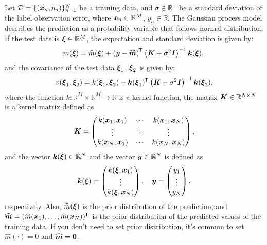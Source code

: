 \documentclass[twocolumn, a4paper, 10pt]{article}
\begin{document}
Let $\mathcal{D} = \{(\boldsymbol{x}_n, y_n)\}_{n=1}^{N}$ be a training data, and $\sigma \in \mathbb{R}^{+}$
be a standard deviation of the label observation error, where $\boldsymbol{x}_n \in \mathbb{R}^M$, $y_n \in \mathbb{R}$.
The Gaussian process model describes the prediction as a probability variable that follows normal distribution.
If the test date is $\boldsymbol{\xi} \in \mathbb{R}^M$, the expectation and standard deviation is given by:
\begin{equation}
    m (\boldsymbol{\xi}) = \widehat{m} (\boldsymbol{\xi}) + \left( \boldsymbol{y} - \widehat{\boldsymbol{m}} \right)^{\mkern-1.5mu\mathsf{T}}\hspace{0.5pt}
    \left (\boldsymbol{K} + \sigma^2 \boldsymbol{I} \right)^{-1} \boldsymbol{k} (\boldsymbol{\xi}),
    \label{eqn:gp_exp} \\
\end{equation}
and the covariance of the test data $\boldsymbol{\xi}_1$, $\boldsymbol{\xi}_2$ is given by:
\begin{equation}
    v (\boldsymbol{\xi}_1, \boldsymbol{\xi}_2) = k (\boldsymbol{\xi}_1, \boldsymbol{\xi}_2)
    - \boldsymbol{k} (\boldsymbol{\xi}_1)^{\mkern-1.5mu\mathsf{T}}\hspace{0.5pt} \left( \boldsymbol{K} - \sigma^2 \boldsymbol{I} \right)^{-1} \boldsymbol{k} (\boldsymbol{\xi}_2),
    \label{eqn:gp_cov}
\end{equation}
where the function $k: \mathbb{R}^M \times \mathbb{R}^M \to \mathbb{R}$ is a kernel function,
the matrix $\boldsymbol{K} \in \mathbb{R}^{N \times N}$ is a kernel matrix defined as
\begin {equation}
    \boldsymbol{K} = \begin{pmatrix}
        k (\boldsymbol{x}_1, \boldsymbol{x}_1) & \cdots & k (\boldsymbol{x}_1, \boldsymbol{x}_N) \\
        \vdots & \ddots & \vdots \\
        k (\boldsymbol{x}_N, \boldsymbol{x}_1) & \cdots & k (\boldsymbol{x}_N, \boldsymbol{x}_N) \\
    \end{pmatrix},
\end{equation}
and the vector $\boldsymbol{k} (\boldsymbol{\xi}) \in \mathbb{R}^N$ and
the vector $\boldsymbol{y} \in \mathbb{R}^N$ is defined as
\begin{equation}
    \boldsymbol{k} (\boldsymbol{\xi}) = \begin{pmatrix}
        k (\boldsymbol{\xi}, \boldsymbol{x}_1) \\
        \vdots \\
        k (\boldsymbol{\xi}, \boldsymbol{x}_N) \\
    \end{pmatrix},
    \hspace{10pt}
    \boldsymbol{y} = \begin{pmatrix}
        y_1 \\ \vdots \\ y_N \\
    \end{pmatrix},
\end{equation}
respectively.
Also, $\widehat{m} (\boldsymbol{\xi})$ is the prior distribution of the prediction, and
$\widehat{\boldsymbol{m}} = (\widehat{m} (\boldsymbol{x}_1), \ldots, \widehat{m} (\boldsymbol{x}_N))^{\mkern-1.5mu\mathsf{T}}\hspace{0.5pt}$ is
the prior distribution of the predicted values of the training data. If you don't need to set
prior distribution, it's common to set $\widehat{m} (\cdot) = 0$ and $\widehat{\boldsymbol{m}} = \boldsymbol{0}$.
\end{document}
